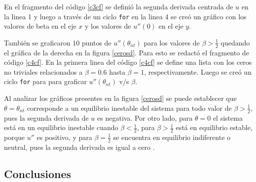 \documentclass[../portafolio.tex]{subfiles}
\begin{document}
En el fragmento del código \ref{c3cf} se definió la segunda derivada centrada de $u$ en la linea 1 y luego a través de un ciclo \texttt{for} en la linea 4 se creó un gráfico con los valores de beta en el eje $x$ y los valores de $u''(0)$ en el eje $y$. 

\vspace{5mm}


También se graficaron 10 puntos de $u''(\theta_{nt})$ para los valores de $\beta > \frac{1}{2}$ quedando el gráfica de la derecha en la figura \ref{cerosd}. Para esto se redactó el fragmento de código \ref{c4cf}.
En la primera linea del código \ref{c4cf} se define una lista con los ceros no triviales relacionados a $\beta=0.6$ hasta $\beta=1$, respectivamente. Luego se creó un ciclo \texttt{for} para para graficar $u''(\theta_{nt})$ v/s $\beta$.

\vspace{5mm}
Al analizar los gráficos presentes en la figura \ref{cerosd} se puede establecer que $\theta =\theta_{nt}$ corresponde a un equilibrio inestable del sistema para todo valor de $\beta>\frac{1}{2}$, pues la segunda derivada de $u$ es negativa. Por otro lado, para $\theta=0$ el sistema está en un equilibrio inestable cuando $\beta<\frac{1}{2}$, para $\beta>\frac{1}{2}$ está en equilibrio estable, porque $u''$ es positivo, y para $\beta=\frac{1}{2}$ se encuentra en equilibrio indiferente o neutral, pues la segunda derivada es igual a cero \cite{equilibrio}.


\subsection{Conclusiones}
\end{document}
